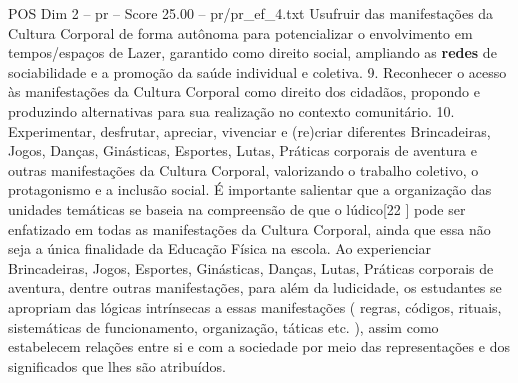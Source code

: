 \begin{textsample}{POS Dim 2 – pr – Score 25.00 – pr/pr\_ef\_4.txt}
Usufruir das manifestações da Cultura Corporal de forma autônoma para potencializar o envolvimento em tempos/espaços de Lazer, garantido como direito social, ampliando as \textbf{redes} de sociabilidade e a promoção da saúde individual e coletiva. 9.
Reconhecer o acesso às manifestações da Cultura Corporal como direito dos cidadãos, propondo e produzindo alternativas para sua realização no contexto comunitário. 10.
Experimentar, desfrutar, apreciar, vivenciar e (re)criar diferentes Brincadeiras, Jogos, Danças, Ginásticas, Esportes, Lutas, Práticas corporais de aventura e outras manifestações da Cultura Corporal, valorizando o trabalho coletivo, o protagonismo e a inclusão social.
É importante salientar que a organização das unidades temáticas se baseia na compreensão de que o lúdico[22 ] pode ser enfatizado em todas as manifestações da Cultura Corporal, ainda que essa não seja a única finalidade da Educação Física na escola.
Ao experienciar Brincadeiras, Jogos, Esportes, Ginásticas, Danças, Lutas, Práticas corporais de aventura, dentre outras manifestações, para além da ludicidade, os estudantes se apropriam das lógicas intrínsecas a essas manifestações ( regras, códigos, rituais, sistemáticas de funcionamento, organização, táticas etc. ), assim como estabelecem relações entre si e com a sociedade por meio das representações e dos significados que lhes são atribuídos.

\end{textsample}
